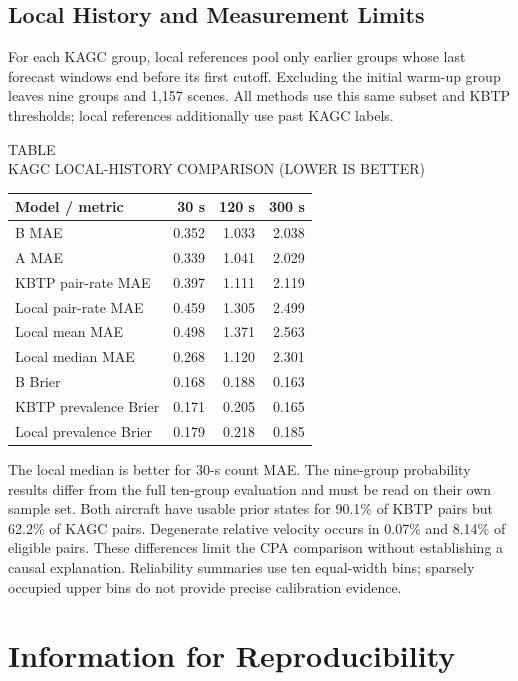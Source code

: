 \documentclass[10pt,journal,letterpaper]{IEEEtran}
\begin{document}
\subsection{Local History and Measurement Limits}
For each KAGC group, local references pool only earlier groups whose last forecast windows end before its first cutoff. Excluding the initial warm-up group leaves nine groups and 1,157 scenes. All methods use this same subset and KBTP thresholds; local references additionally use past KAGC labels.

\begin{center}
\label{tab:local}
TABLE \thetable\\
KAGC LOCAL-HISTORY COMPARISON (LOWER IS BETTER)\par
\medskip
\setlength{\tabcolsep}{3pt}
\begin{tabular}{lrrr}
\toprule
Model / metric & 30 s & 120 s & 300 s\\
\midrule
B MAE & 0.352 & 1.033 & 2.038\\
A MAE & 0.339 & 1.041 & 2.029\\
KBTP pair-rate MAE & 0.397 & 1.111 & 2.119\\
Local pair-rate MAE & 0.459 & 1.305 & 2.499\\
Local mean MAE & 0.498 & 1.371 & 2.563\\
Local median MAE & 0.268 & 1.120 & 2.301\\
B Brier & 0.168 & 0.188 & 0.163\\
KBTP prevalence Brier & 0.171 & 0.205 & 0.165\\
Local prevalence Brier & 0.179 & 0.218 & 0.185\\
\bottomrule
\end{tabular}
\end{center}

The local median is better for 30-s count MAE. The nine-group probability results differ from the full ten-group evaluation and must be read on their own sample set. Both aircraft have usable prior states for 90.1\% of KBTP pairs but 62.2\% of KAGC pairs. Degenerate relative velocity occurs in 0.07\% and 8.14\% of eligible pairs. These differences limit the CPA comparison without establishing a causal explanation. Reliability summaries use ten equal-width bins; sparsely occupied upper bins do not provide precise calibration evidence.

\clearpage
\section{Information for Reproducibility}
\end{document}
